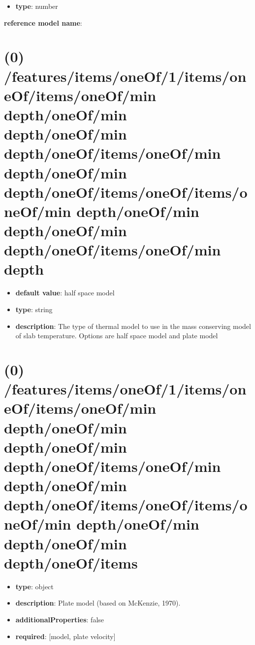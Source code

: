 \begin{itemize}[leftmargin=3em]\item {\bf type}: number
\end{itemize}\item {\bf reference model name}: \section{(0) /features/items/oneOf/1/items/oneOf/items/oneOf/min depth/oneOf/min depth/oneOf/min depth/oneOf/items/oneOf/min depth/oneOf/min depth/oneOf/items/oneOf/items/oneOf/min depth/oneOf/min depth/oneOf/min depth/oneOf/items/oneOf/min depth}
\begin{itemize}[leftmargin=0em]\item {\bf default value}: half space model
\item {\bf type}: string
\item {\bf description}: The type of thermal model to use in the mass conserving model of slab temperature. Options are half space model and plate model
\end{itemize}\section{(0) /features/items/oneOf/1/items/oneOf/items/oneOf/min depth/oneOf/min depth/oneOf/min depth/oneOf/items/oneOf/min depth/oneOf/min depth/oneOf/items/oneOf/items/oneOf/min depth/oneOf/min depth/oneOf/min depth/oneOf/items}
\begin{itemize}[leftmargin=0em]\item {\bf type}: object
\item {\bf description}: Plate model (based on McKenzie, 1970).
\item {\bf additionalProperties}: false
\item {\bf required}: [model, plate velocity]\end{itemize}
